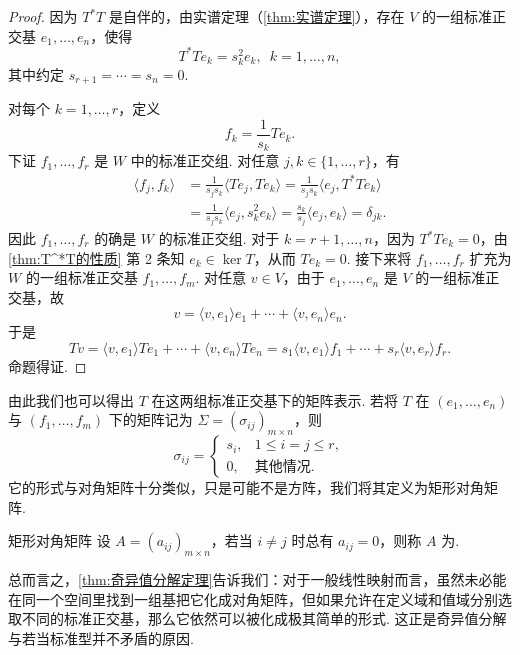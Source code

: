 \begin{proof}
    因为 $T^*T$ 是自伴的，由实谱定理（\autoref{thm:实谱定理}），存在 $V$ 的一组标准正交基 $e_1, \ldots, e_n$，使得
    \[
        T^*Te_k = s_k^2 e_k,\enspace k = 1, \ldots, n,
    \]
    其中约定 $s_{r+1} = \cdots = s_n = 0$.

    对每个 $k = 1, \ldots, r$，定义
    \[
        f_k = \frac{1}{s_k}Te_k.
    \]
    下证 $f_1, \ldots, f_r$ 是 $W$ 中的标准正交组. 对任意 $j, k \in \{1, \ldots, r\}$，有
    \begin{align*}
        \langle f_j, f_k \rangle
         & = \frac{1}{s_j s_k}\langle Te_j, Te_k \rangle
          = \frac{1}{s_j s_k}\langle e_j, T^*Te_k \rangle \\
         & = \frac{1}{s_j s_k}\langle e_j, s_k^2 e_k \rangle
          = \frac{s_k}{s_j}\langle e_j, e_k \rangle
          = \delta_{jk}.
    \end{align*}
    因此 $f_1, \ldots, f_r$ 的确是 $W$ 的标准正交组. 对于 $k = r+1, \ldots, n$，因为 $T^*Te_k = 0$，由\autoref{thm:T^*T的性质} 第 2 条知 $e_k \in \ker T$，从而 $Te_k = 0$. 接下来将 $f_1, \ldots, f_r$ 扩充为 $W$ 的一组标准正交基 $f_1, \ldots, f_m$. 对任意 $v \in V$，由于 $e_1, \ldots, e_n$ 是 $V$ 的一组标准正交基，故
    \[
        v = \langle v, e_1 \rangle e_1 + \cdots + \langle v, e_n \rangle e_n.
    \]
    于是
    \[ Tv = \langle v, e_1 \rangle Te_1 + \cdots + \langle v, e_n \rangle Te_n = s_1 \langle v, e_1 \rangle f_1 + \cdots + s_r \langle v, e_r \rangle f_r. \]
    命题得证.
\end{proof}

由此我们也可以得出 $T$ 在这两组标准正交基下的矩阵表示. 若将 $T$ 在 $(e_1, \ldots, e_n)$ 与 $(f_1, \ldots, f_m)$ 下的矩阵记为 $\Sigma = (\sigma_{ij})_{m \times n}$，则
\[
    \sigma_{ij} =
    \begin{cases}
        s_i, & 1 \leqslant i = j \leqslant r, \\
        0,   & \text{其他情况}.
    \end{cases}
\]
它的形式与对角矩阵十分类似，只是可能不是方阵，我们将其定义为矩形对角矩阵.

\begin{definition}{矩形对角矩阵}{} 
    设 $A = (a_{ij})_{m \times n}$，若当 $i \neq j$ 时总有 $a_{ij} = 0$，则称 $A$ 为.
\end{definition}

总而言之，\autoref{thm:奇异值分解定理}告诉我们：对于一般线性映射而言，虽然未必能在同一个空间里找到一组基把它化成对角矩阵，但如果允许在定义域和值域分别选取不同的标准正交基，那么它依然可以被化成极其简单的形式. 这正是奇异值分解与若当标准型并不矛盾的原因.

